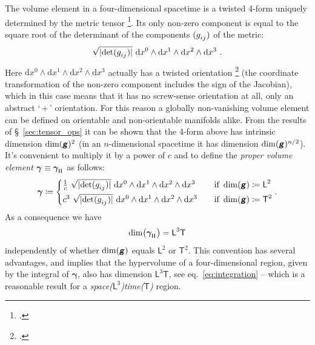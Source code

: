 \documentclass[\ifafour a4paper,12pt,\else a5paper,10pt,\fi%
onecolumn,oneside,article,%
british%
]{memoir}
\makeatletter
\newcommand*{\mathquote}[1]{`\,#1\,'}
\theoremstyle{remark}
\theoremstyle{innote}
\newcommand*{\mathte}[1]{\textbf{\textit{\textsf{#1}}}}
\newcommand*{\citep}{\footcites}
\newcommand*{\di}{\mathrm{d}}%
\newcommand*{\defd}{\coloneqq}
\DeclarePairedDelimiter\abs{\lvert}{\rvert}
\renewcommand*{\|}[1][]{\nonscript\,#1\vert\nonscript\;\mathopen{}}
\newcommand*{\sect}{\S}%
\newcommand*{\chap}{ch.}%
\newcommand*{\eqn}{eq.}%
\newcommand*{\q}{}%
\DeclareRobustCommand*{\q}{%
  \mathord{\mathpalette\bigcdot@{}}%
}
\newcommand*{\bigcdot@scalefactor}{0.7}
\newcommand*{\bigcdot@widthfactor}{1.5}
\newcommand*{\bigcdot@}[2]{%
  \sbox0{$#1\vcenter{}$}%
  \sbox2{$#1\cdot\m@th$}%
  \hbox to \bigcdot@widthfactor\wd2{%
    \hfil
    \raise\ht0\hbox{%
      \scalebox{\bigcdot@scalefactor}{%
        \lower\ht0\hbox{$#1\bullet\m@th$}%
      }%
    }%
    \hfil
  }%
}
\newcommand*{\Le}{\textsf{L}}
\newcommand*{\Ti}{\textsf{T}}
\newcommand*{\Li}{\textsf{L}}
\newcommand*{\yg}{\mathte{g}}
\renewcommand*{\i}{\indices}
\newcommand*{\dix}[1][i]{\di x^{#1}}
\newcommand*{\ygv}{\bm{\gamma}}
\newcommand*{\rul}{{\mkern2mu\rule[-0.1ex]{0.75pt}{1.1ex}\mkern2mu}}
\DeclarePairedDelimiter\mul{\rul}{\rul}%
\makeatother
\begin{document}
The volume element in a four-dimensional spacetime is a twisted 4-form
uniquely determined by the metric tensor
\citep[\sect~V.24]{derham1955_t1984}[\sect~V.A.4]{choquetbruhatetal1977_r1996}[\sect~6.2]{abrahametal1983_r1988}.
Its only non-zero component is equal to the square root of the determinant
of the %
components $(g\i{_{ij}})$ of the metric:
\begin{equation*}
  \label{eq:undim_volume_elem}
  \sqrt{\smash[b]{\abs{\det(g\i{_{ij}})}}}\ \dix[0]\land\dix[1]\land\dix[2]\land\dix[3] \ .
\end{equation*}
Here
$\dix[0]\land\dix[1]\land\dix[2]\land\dix[3]$ %
actually has a twisted orientation \citep[\chap~6 p.~60,
\chap~9]{frankel1979} (the coordinate transformation of the non-zero
component includes the sign of the Jacobian), which in this case means that
it has no screw-sense orientation at all, only an abstract \mathquote{$+$}
orientation. For this reason a globally non-vanishing volume element can be
defined on orientable and non-orientable manifolds alike. From the results
of \sect~\ref{sec:tensor_ops} it can be shown that the 4-form above has
intrinsic dimension $\dim(\yg)^{2}$ (in an $n$-dimensional spacetime it has
dimension $\dim(\yg)^{n/2}$). It's convenient to multiply it by a power of
$c$ and to define the \emph{proper volume element}
$\ygv \equiv \ygv\i{_{\mul{\q\q\q\q}}}$ as follows:
\begin{equation}
  \label{eq:volume_elem}
  \ygv \defd
      \begin{cases}
        \frac{1}{c}\
        \sqrt{\smash[b]{\abs{\det(g\i{_{ij}})}}}\ \dix[0]\land\dix[1]\land\dix[2]\land\dix[3] &\quad  \text{if }\dim(\yg)\defd    \Le^2 \\[\jot]
        c^{3}\
        \sqrt{\smash[b]{\abs{\det(g\i{_{ij}})}}}\ \dix[0]\land\dix[1]\land\dix[2]\land\dix[3] &\quad  \text{if }\dim(\yg)\defd
     \Ti^2
  \end{cases}.
\end{equation}
As a consequence we have
\begin{equation}
  \label{eq:dim_volume_elem}
  \dim\bigl(\ygv\i{_{\mul{\q\q\q\q}}}\bigr) = \Le^{3}\Ti
\end{equation}
independently of whether $\dim(\yg)$ equals $\Li^{2}$ or $\Ti^{2}$. This
convention has several advantages, and implies that the hypervolume of a
four-dimensional region, given by the integral of $\ygv$, also has
dimension $\Li^{3}\Ti$, see \eqn~\eqref{eq:integration} -- which is a
reasonable result for a
\emph{space\textnormal{($\Le^{3}$)}time\textnormal{($\Ti$)}} region.
\end{document}
